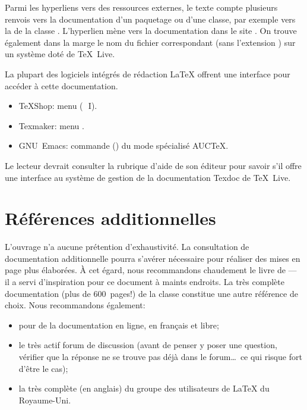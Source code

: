 Parmi les hyperliens vers des ressources externes, le texte compte
plusieurs renvois vers la documentation d'un paquetage ou d'une
classe, par exemple vers la %
de la classe . L'hyperlien mène vers la documentation
dans le site %
. On trouve également dans la
marge le nom du fichier correspondant (sans l'extension )
sur un système doté de {\TeX}~Live.

La plupart des logiciels intégrés de rédaction {\LaTeX} offrent une
interface pour accéder à cette documentation.
\begin{itemize}
\item TeXShop: menu  (\optkey\,\cmdkey\, I).
\item Texmaker: menu .
\item GNU~Emacs: commande  () du mode
  spécialisé AUC{\TeX}.
\end{itemize}
Le lecteur devrait consulter la rubrique d'aide de son éditeur pour
savoir s'il offre une interface au système de gestion de la
documentation Texdoc de {\TeX}~Live.

\section*{Références additionnelles}

L'ouvrage n'a aucune prétention d'exhaustivité. La consultation de
documentation additionnelle pourra s'avérer nécessaire pour réaliser
des mises en page plus élaborées. À cet égard, nous recommandons
chaudement le livre de \citet{Kopka:latex:4e} --- il a servi
d'inspiration pour ce document à maints endroits. La très complète
documentation (plus de 600~pages!) de la classe 
\citep{memoir} constitue une autre référence de choix. Nous
recommandons également:
\begin{itemize}
\item {} pour de la documentation en ligne, en français et
  libre;
\item le très actif forum de discussion
  (avant de penser y poser une question, vérifier que la réponse ne se trouve
  pas déjà dans le forum\dots\ ce qui risque fort d'être le cas);
\item la très complète
   (en anglais) du groupe des
  utilisateurs de {\LaTeX} du Royaume-Uni.
\end{itemize}

